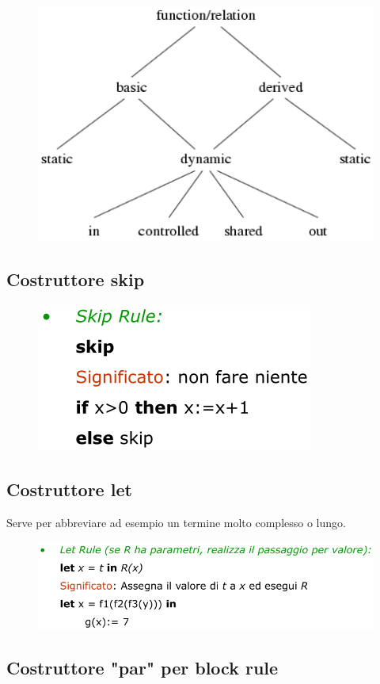 \begin{figure}[H]
    \centering
    \includegraphics[width=0.7\linewidth]{chapters/1-asm/images/classificazione-funzioni.png}
\end{figure}

\subsection{Costruttore skip}
\begin{figure}[H]
    \includegraphics[width=0.4\linewidth]{chapters/1-asm/images/skip.png}
\end{figure}

\newpage
\subsection{Costruttore let}
Serve per abbreviare ad esempio un termine molto complesso o lungo. 

\begin{figure}[H]
    \includegraphics[width=0.8\linewidth]{chapters/1-asm/images/let.png}
\end{figure}

\subsection{Costruttore "par" per block rule}

